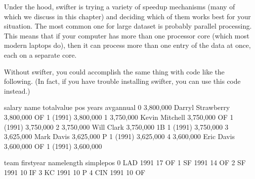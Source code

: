 \documentclass[letterpaper,10pt,english]{sphinxmanual}
\begin{document}
Under the hood, swifter is trying a variety of speedup mechanisms (many of which we discuss in this chapter) and deciding which of them works best for your situation.  The most common one for large dataset is probably parallel processing.  This means that if your computer has more than one processor core (which most modern laptops do), then it can process more than one entry of the data at once, each on a separate core.

Without swifter, you could accomplish the same thing with code like the following.  (In fact, if you have trouble installing swifter, you can use this code instead.)

\begin{sphinxVerbatim}[commandchars=\\\{\}]
   
  

    
\PYG{p}{[}\PYG{p}{]}    \PYG{p}{[}\PYG{p}{]}  


\end{sphinxVerbatim}

\begin{sphinxVerbatim}[commandchars=\\\{\}]
        salary               name  total\PYGZus{}value pos     years   avg\PYGZus{}annual  \PYGZbs{}
0  \PYGZdl{} 3,800,000  Darryl Strawberry  \PYGZdl{} 3,800,000  OF  1 (1991)  \PYGZdl{} 3,800,000   
1  \PYGZdl{} 3,750,000     Kevin Mitchell  \PYGZdl{} 3,750,000  OF  1 (1991)  \PYGZdl{} 3,750,000   
2  \PYGZdl{} 3,750,000         Will Clark  \PYGZdl{} 3,750,000  1B  1 (1991)  \PYGZdl{} 3,750,000   
3  \PYGZdl{} 3,625,000         Mark Davis  \PYGZdl{} 3,625,000   P  1 (1991)  \PYGZdl{} 3,625,000   
4  \PYGZdl{} 3,600,000         Eric Davis  \PYGZdl{} 3,600,000  OF  1 (1991)  \PYGZdl{} 3,600,000   

  team  first\PYGZus{}year  name\PYGZus{}length simple\PYGZus{}pos  
0  LAD        1991           17         OF  
1   SF        1991           14         OF  
2   SF        1991           10         IF  
3   KC        1991           10          P  
4  CIN        1991           10         OF  
\end{sphinxVerbatim}
\end{document}
